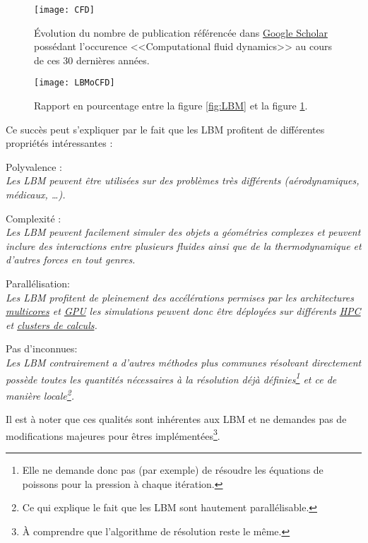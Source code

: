 \begin{figure}[htp]
  \center
  \texttt{[image: CFD]} 
  \caption{Évolution du nombre de publication référencée dans \href{https://scholar.google.fr/}{Google Scholar} 
              possédant l'occurence <<Computational fluid dynamics>> au cours de ces 30 dernières années.}
  \label{fig:CFD}
\end{figure}

\begin{figure}[htp]
  \center
  \texttt{[image: LBMoCFD]} 
  \caption{Rapport en pourcentage entre la figure \ref{fig:LBM} et la figure \ref{fig:CFD}.}
  \label{fig:ratio}
\end{figure}
  
  Ce succès peut s'expliquer par le fait que les LBM profitent de différentes propriétés intéressantes :
  \begin{itemize}
    \itemb Polyvalence :\\
    \emph{Les LBM peuvent être utilisées sur des problèmes très différents (aérodynamiques, médicaux, \dots{}).}

    \itemb Complexité :\\
    \emph{Les LBM peuvent facilement simuler des objets a géométries complexes et peuvent inclure des interactions entre
    plusieurs fluides ainsi que de la thermodynamique et d'autres forces en tout genres.}

    \itemb Parallélisation:\\
    \emph{Les LBM profitent de pleinement des accélérations permises par les architectures 
    \href{https://fr.wikipedia.org/wiki/Microprocesseur_multi-c\%C5\%93ur}{multicores} et 
    \href{https://fr.wikipedia.org/wiki/Processeur_graphique}{GPU} les simulations peuvent donc être déployées sur 
    différents \href{https://fr.wikipedia.org/wiki/Superordinateur}{HPC} et
    \href{https://fr.wikipedia.org/wiki/Grappe_de_serveurs}{clusters de calculs}.}
    
    \itemb Pas d'inconnues:\\
    \emph{Les LBM contrairement a d'autres méthodes plus communes résolvant directement \NS{} possède toutes les quantités
    nécessaires à la résolution déjà définies\footnote{Elle ne demande donc pas (par exemple) de résoudre les équations de
    poissons pour la pression à chaque itération.} et ce de manière locale\footnote{Ce qui explique le fait que les LBM 
    sont hautement parallélisable.}.}
  \end{itemize}
  
   Il est à noter que ces qualités sont inhérentes aux LBM et ne demandes pas de modifications majeures pour êtres 
   implémentées\footnote{À comprendre que l'algorithme de résolution reste le même.}.
   